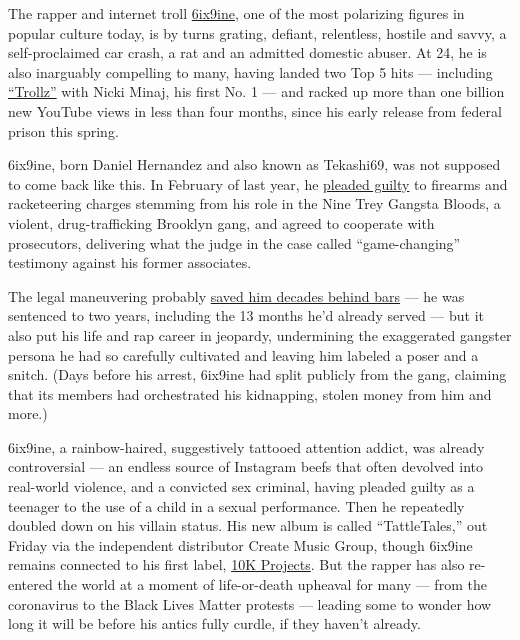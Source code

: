 The rapper and internet troll
\href{https://www.nytimes3xbfgragh.onion/2018/11/29/nyregion/tekashi6ix9ine-jail-treyway.html}{6ix9ine},
one of the most polarizing figures in popular culture today, is by turns
grating, defiant, relentless, hostile and savvy, a self-proclaimed car
crash, a rat and an admitted domestic abuser. At 24, he is also
inarguably compelling to many, having landed two Top 5 hits ---
including \href{https://www.youtube.com/watch?v=oNg3M9IJJlY}{``Trollz''}
with Nicki Minaj, his first No. 1 --- and racked up more than one
billion new YouTube views in less than four months, since his early
release from federal prison this spring.

6ix9ine, born Daniel Hernandez and also known as Tekashi69, was not
supposed to come back like this. In February of last year, he
\href{https://www.nytimes3xbfgragh.onion/2019/02/01/nyregion/tekashi-69-pleads-guilty.html}{pleaded
guilty} to firearms and racketeering charges stemming from his role in
the Nine Trey Gangsta Bloods, a violent, drug-trafficking Brooklyn gang,
and agreed to cooperate with prosecutors, delivering what the judge in
the case called ``game-changing'' testimony against his former
associates.

The legal maneuvering probably
\href{https://www.nytimes3xbfgragh.onion/2019/12/18/nyregion/tekashi-69-sentenced.html}{saved
him decades behind bars} --- he was sentenced to two years, including
the 13 months he'd already served --- but it also put his life and rap
career in jeopardy, undermining the exaggerated gangster persona he had
so carefully cultivated and leaving him labeled a poser and a snitch.
(Days before his arrest, 6ix9ine had split publicly from the gang,
claiming that its members had orchestrated his kidnapping, stolen money
from him and more.)

6ix9ine, a rainbow-haired, suggestively tattooed attention addict, was
already controversial --- an endless source of Instagram beefs that
often devolved into real-world violence, and a convicted sex criminal,
having pleaded guilty as a teenager to the use of a child in a sexual
performance. Then he repeatedly doubled down on his villain status. His
new album is called ``TattleTales,'' out Friday via the independent
distributor Create Music Group, though 6ix9ine remains connected to his
first label,
\href{https://variety.com/2019/music/features/elliot-grainge-10k-projects-tekashi-6ix9ine-trippie-redd-1203423051/}{10K
Projects}. But the rapper has also re-entered the world at a moment of
life-or-death upheaval for many --- from the coronavirus to the Black
Lives Matter protests --- leading some to wonder how long it will be
before his antics fully curdle, if they haven't already.


